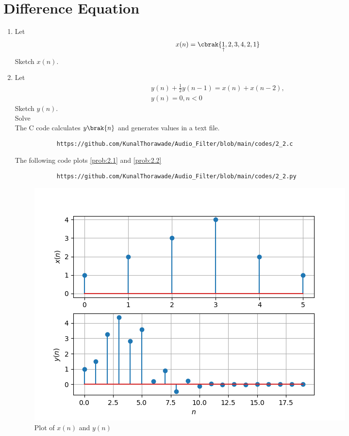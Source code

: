 \documentclass[journal,12pt,twocolumn]{IEEEtran}
\theoremstyle{remark}
\begin{document}
		    \section{Difference Equation}
		    \begin{enumerate}[label=\thesection.\arabic*,ref=\thesection.\theenumi]
		    \item Let
		    \begin{equation}
		    x(n) = \cbrak{\underset{\uparrow}{1},2,3,4,2,1} \label{prob:2.1}
		    \end{equation}
		    Sketch $x(n)$. 
		    \item Let
		    \begin{multline}
		    y(n) + \frac{1}{2}y(n-1) = x(n) + x(n-2), 
		    \\
		    y(n) = 0, n < 0 \label{prob:2.2}
		    \end{multline}
		    Sketch $y(n)$.\\
		    Solve\\
		    \solution  The C code calculates $y\brak{n}$ and generates values in a text file.
		    \begin{lstlisting}
		    https://github.com/KunalThorawade/Audio_Filter/blob/main/codes/2_2.c
		    \end{lstlisting} 
		    The following code plots \eqref{prob:2.1} and \eqref{prob:2.2}
		    \begin{lstlisting}
		    https://github.com/KunalThorawade/Audio_Filter/blob/main/codes/2_2.py
		    \end{lstlisting}

		    \begin{figure}[H]
		    	\centering
				\includegraphics[width=\columnwidth]{figs/Plot_xn_yn.png}
					\caption{Plot of $x(n)$ and $y(n)$}
						\label{fig:xnyn}
						\end{figure}
						\end{enumerate}
\end{document}
